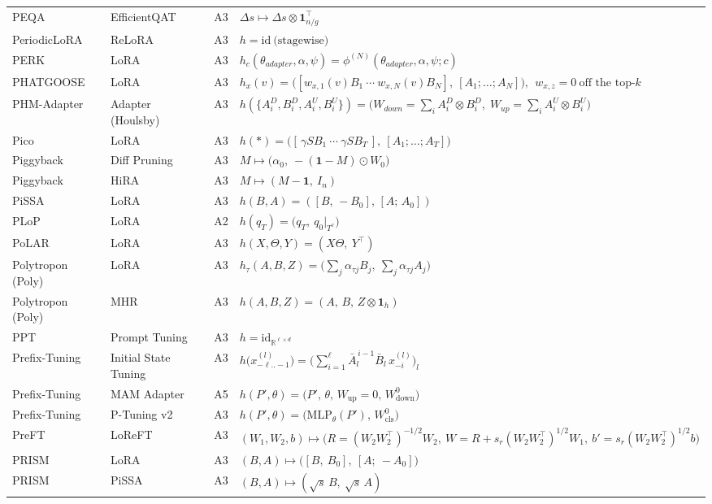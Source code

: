 \begin{longtable}{@{}>{\raggedright\arraybackslash}p{2.4cm}>{\raggedright\arraybackslash}p{2.4cm}c>{\raggedright\arraybackslash}p{8.6cm}@{}}
PEQA & EfficientQAT & A3 & $\Delta s\mapsto\Delta s\otimes\mathbf 1_{n/g}^\top$\\
PeriodicLoRA & ReLoRA & A3 & $h=\mathrm{id}\ \text{(stagewise)}$\\
PERK & LoRA & A3 & $h_c(\theta_{adapter},\alpha,\psi)=\phi^{(N)}(\theta_{adapter},\alpha,\psi;c)$\\
PHATGOOSE & LoRA & A3 & $h_x(v)=\big([w_{x,1}(v)B_1\ \cdots\ w_{x,N}(v)B_N],\ [A_1;\dots;A_N]\big),\ \ w_{x,z}=0\ \text{off the top-}k$\\
PHM-Adapter & Adapter (Houlsby) & A3 & $h(\{A_i^D,B_i^D,A_i^U,B_i^U\})=\big(W_{down}=\textstyle\sum_iA_i^D\otimes B_i^D,\;W_{up}=\sum_iA_i^U\otimes B_i^U\big)$\\
Pico & LoRA & A3 & $h(\ast)=\big([\,\gamma SB_1\ \cdots\ \gamma SB_T\,],\ [A_1;\dots;A_T]\big)$\\
Piggyback & Diff Pruning & A3 & $M\mapsto\big(\alpha_0,\ -(\mathbf 1-M)\odot W_0\big)$\\
Piggyback & HiRA & A3 & $M\mapsto(M-\mathbf 1,\ I_n)$\\
PiSSA & LoRA & A3 & $h(B,A)=([B,\,-B_0],\,[A;\,A_0])$\\
PLoP & LoRA & A2 & $h(q_T)=\big(q_T,\ q_0|_{T^{c}}\big)$\\
PoLAR & LoRA & A3 & $h(X,\Theta,Y)=(X\Theta,\ Y^\top)$\\
Polytropon (Poly) & LoRA & A3 & $h_\tau(A,B,Z)=\big(\textstyle\sum_j\alpha_{\tau j}B_j,\ \sum_j\alpha_{\tau j}A_j\big)$\\
Polytropon (Poly) & MHR & A3 & $h(A,B,Z)=(A,\,B,\,Z\otimes\mathbf 1_h)$\\
PPT & Prompt Tuning & A3 & $h=\mathrm{id}_{\mathbb R^{\ell\times d}}$\\
Prefix-Tuning & Initial State Tuning & A3 & $h\big(x^{(l)}_{-\ell..-1}\big)=\Big(\textstyle\sum_{i=1}^{\ell}\bar A_l^{\,i-1}\bar B_l\,x^{(l)}_{-i}\Big)_{l}$\\
Prefix-Tuning & MAM Adapter & A5 & $h(P',\theta)=\big(P',\,\theta,\,W_{\mathrm{up}}=0,\,W^{0}_{\mathrm{down}}\big)$\\
Prefix-Tuning & P-Tuning v2 & A3 & $h(P',\theta)=\big(\mathrm{MLP}_\theta(P'),\,W^{0}_{\mathrm{cls}}\big)$\\
PreFT & LoReFT & A3 & $(W_1,W_2,b)\mapsto\big(R=(W_2W_2^{\top})^{-1/2}W_2,\ W=R+s_r(W_2W_2^{\top})^{1/2}W_1,\ b'=s_r(W_2W_2^{\top})^{1/2}b\big)$\\
PRISM & LoRA & A3 & $(B,A)\mapsto\big([B,\ B_0],\ [A;\ -A_0]\big)$\\
PRISM & PiSSA & A3 & $(B,A)\mapsto(\sqrt s\,B,\ \sqrt s\,A)$\\

\end{longtable}
